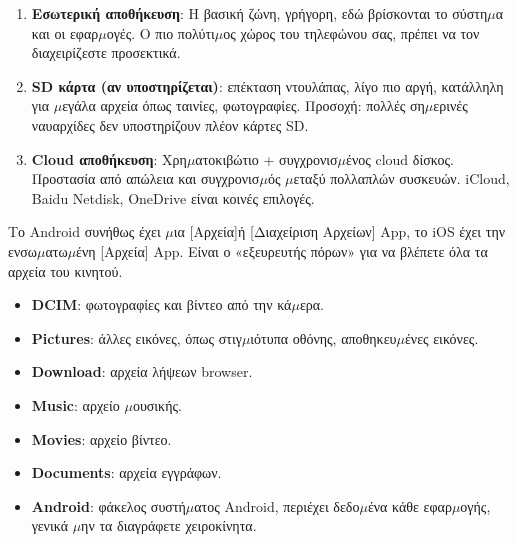 


\begin{enumerate}
  \item \textbf{Εσωτερική αποθήκευση}: Η βασική ζώνη, γρήγορη, εδώ βρίσκονται το σύστη$\mu$α και οι εφαρ$\mu$ογές. Ο πιο πολύτι$\mu$ος χώρος του τηλεφώνου σας, πρέπει να τον διαχειρίζεστε προσεκτικά.
  \item \textbf{SD κάρτα (αν υποστηρίζεται)}: επέκταση ντουλάπας, λίγο πιο αργή, κατάλληλη για $\mu$εγάλα αρχεία όπως ταινίες, φωτογραφίες. Προσοχή: πολλές ση$\mu$ερινές ναυαρχίδες δεν υποστηρίζουν πλέον κάρτες SD.
  \item \textbf{Cloud αποθήκευση}: Χρη$\mu$ατοκιβώτιο + συγχρονισ$\mu$ένος cloud δίσκος. Προστασία από απώλεια και συγχρονισ$\mu$ός $\mu$εταξύ πολλαπλών συσκευών. iCloud, Baidu Netdisk, OneDrive είναι κοινές επιλογές.
\end{enumerate}


Το Android συνήθως έχει $\mu$ια [Αρχεία]ή [Διαχείριση Αρχείων] App, το iOS έχει την ενσω$\mu$ατω$\mu$ένη [Αρχεία] App. Είναι ο «εξευρευτής πόρων» για να βλέπετε όλα τα αρχεία του κινητού.


\begin{itemize}
  \item \textbf{DCIM}: φωτογραφίες και βίντεο από την κά$\mu$ερα.
  \item \textbf{Pictures}: άλλες εικόνες, όπως στιγ$\mu$ιότυπα οθόνης, αποθηκευ$\mu$ένες εικόνες.
  \item \textbf{Download}: αρχεία λήψεων browser.
  \item \textbf{Music}: αρχείο $\mu$ουσικής.
  \item \textbf{Movies}: αρχείο βίντεο.
  \item \textbf{Documents}: αρχεία εγγράφων.
  \item \textbf{Android}: φάκελος συστή$\mu$ατος Android, περιέχει δεδο$\mu$ένα κάθε εφαρ$\mu$ογής, γενικά $\mu$ην τα διαγράφετε χειροκίνητα.
\end{itemize}

